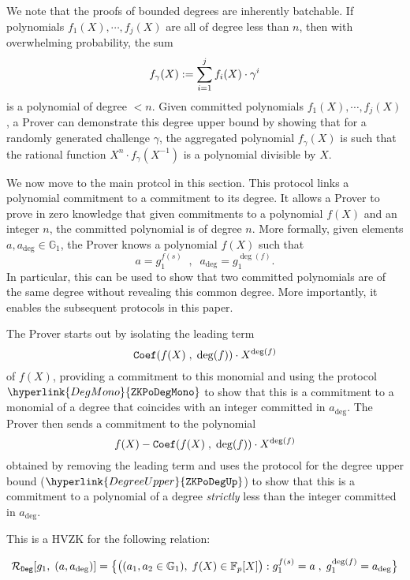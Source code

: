 \documentclass[11pt, lettersize, notitlepage, leqno, footskip=0.6cm]{article}
\newcommand{\bFp}{\mathbb{F}_p}
\newcommand{\mc}{\mathcal}
\newcommand{\mb}{\mathbb}
\newcommand{\vs}{\vspace{-0.15cm}}
\newcommand{\noin}{\noindent}
\newcommand{\op}{overwhelming probability}
\numberwithin{equation}{section}
\begin{document}
\noin We note that the proofs of bounded degrees are inherently batchable. If polynomials $f_1(X),\cdots,f_j(X)$ are all of degree less than $n$, then with \op, the sum \vs $$ f_{\gamma}(X):= \sum\limits_{i=1}^j f_i(X)\cdot \gamma^i \vs $$ is a polynomial of degree $< n$. Given committed polynomials $f_1(X),\cdots,f_j(X)$, a Prover can demonstrate this degree upper bound by showing that for a randomly generated challenge $\gamma$, the aggregated polynomial $ f_{\gamma}(X) $ is such that the rational function $X^n\cdot f_{\gamma}(X^{-1})$ is a polynomial divisible by $X$.





We now move to the main protcol in this section. This protocol links a polynomial commitment to a commitment to its degree. It allows a Prover to prove in zero knowledge that given commitments to a polynomial $f(X)$ and an integer $n$, the committed polynomial is of degree $n$. More formally, given elements $a, a_{\deg}\in \mb{G}_1$, the Prover knows a polynomial $f(X)$ such that \vs $$a = g_1^{f(s)}\;\;,\;\;a_{\deg} = g_1^{\deg(f)}. $$ In particular, this can be used to show that two committed polynomials are of the same degree without revealing this common degree. More importantly, it enables the subsequent protocols in this paper.



The Prover starts out by isolating the leading term \vs $${\tt{Coef}}(f(X)\;,\;\deg(f))\cdot X^{\deg(f)} $$ of $f(X)$, providing a commitment to this monomial and using the protocol $\hyperlink{DegMono}{\tt{ZKPoDegMono}}$ to show that this is a commitment to a monomial of a degree that coincides with an integer committed in $a_{\deg}$. The Prover then sends a commitment to the polynomial \vs $$ f(X)-{\tt{Coef}}(f(X)\;,\;\deg(f))\cdot X^{\deg(f)} $$ obtained by removing the leading term and uses the protocol for the degree upper bound ($\hyperlink{DegreeUpper}{\tt{ZKPoDegUp}}$) to show that this is a commitment to a polynomial of a degree \textit{strictly} less than the integer committed in $a_{\deg}$.

This is a HVZK for the following relation:

\vspace{-3mm} $$\mc{R}_{\tt{Deg}}[g_1,\;(a,a_{\deg})] = \big\{\big((a_1,a_2\in\mb{G}_1),\; f(X)\in \bFp[X]\big): g_1^{f(s)} = a\;,\; g_1^{\deg(f)} = a_{\deg} \big\} $$
\end{document}
